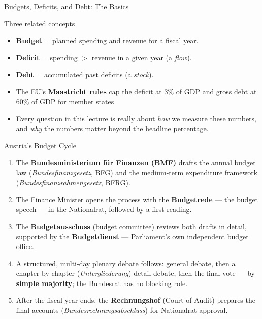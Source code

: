 \documentclass[11pt,aspectratio=169]{beamer}
\begin{document}
\begin{frame}{Budgets, Deficits, and Debt: The Basics}
  \begin{block}{Three related concepts}
    \end{block}
    \begin{itemize}
    \item    \textbf{Budget} = planned spending and revenue for a fiscal year.\\
    \item 	\textbf{Deficit} = spending $>$ revenue in a given year (a \emph{flow}).\\
    \item 	\textbf{Debt} = accumulated past deficits (a \emph{stock}).
\end{itemize}


  \vspace{0.3em}
  \begin{itemize}
    \item The EU's \textbf{Maastricht rules} cap the deficit at 3\% of GDP and gross debt at 60\% of GDP for member states  
    \item Every question in this lecture is really about \emph{how} we measure these numbers, and \emph{why} the numbers matter beyond the headline percentage.
  \end{itemize}
\end{frame}

\begin{frame}{Austria's Budget Cycle}
 
  \begin{enumerate}
    \setlength{\itemsep}{3pt}
    \item The \textbf{Bundesministerium für Finanzen (BMF)} drafts the annual budget law (\emph{Bundesfinanzgesetz}, BFG) and the medium-term expenditure framework (\emph{Bundesfinanzrahmengesetz}, BFRG).
    \item The Finance Minister opens the process with the \textbf{Budgetrede} --- the budget speech --- in the Nationalrat, followed by a first reading.
    \item The \textbf{Budgetausschuss} (budget committee) reviews both drafts in detail, supported by the \textbf{Budgetdienst} --- Parliament's own independent budget office.
    \item A structured, multi-day plenary debate follows: general debate, then a chapter-by-chapter (\emph{Untergliederung}) detail debate, then the final vote --- by \textbf{simple majority}; the Bundesrat has no blocking role.
    \item After the fiscal year ends, the \textbf{Rechnungshof} (Court of Audit) prepares the final accounts (\emph{Bundesrechnungsabschluss}) for Nationalrat approval.
  \end{enumerate}
  
\end{frame}
\end{document}
